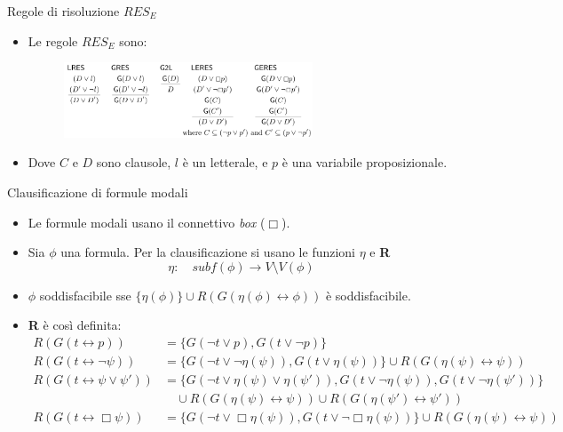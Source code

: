 \documentclass{beamer}
\newcommand{\tto} {\leftrightarrow}
\begin{document}
\begin{frame}{Regole di risoluzione $RES_E$}
    \begin{itemize}
        \item Le regole $RES_E$ sono:
        \begin{figure}
            \centering
            \includegraphics[width=0.7\textwidth, height=0.5\textheight]{assets/res_E.png}
        \end{figure} 
        \item Dove $C$ e $D$ sono clausole, $l$ è un letterale, e $p$ è una variabile proposizionale.
    \end{itemize}
\end{frame}

\begin{frame}{Clausificazione di formule modali}
    \begin{itemize}
        \item Le formule modali usano il connettivo \emph{box} ($\Box$).
        \item Sia $\phi$ una formula. Per la clausificazione si usano le funzioni $\eta$ e \textbf{R}
        \[
            \eta: \quad subf(\phi) \to V \setminus V(\phi)
        \]
        \item $\phi$ soddisfacibile sse $\{ \eta(\phi) \} \cup R(G(\eta(\phi) \tto \phi))$ è soddisfacibile.
        \item \textbf{R} è così definita:
        \[
            \begin{aligned}
            R(G(t \tto p)) &= \{ G(\lnot t \lor p), G(t \lor \lnot p) \} \\
            R(G(t \tto \lnot \psi)) &= \{ G(\lnot t \lor \lnot \eta(\psi)), G(t \lor \eta(\psi)) \} \cup R(G(\eta(\psi) \tto \psi)) \\
            R(G(t \tto \psi \lor \psi')) &= \{ G(\lnot t \lor \eta(\psi) \lor \eta(\psi')), G(t \lor \lnot \eta(\psi)), G(t \lor \lnot \eta(\psi')) \} \\
            & \quad \cup R(G(\eta(\psi) \tto \psi)) \cup R(G(\eta(\psi') \tto \psi')) \\
            R(G(t \tto \Box \psi)) &= \{ G(\lnot t \lor \Box \eta(\psi)), G(t \lor \lnot \Box \eta(\psi)) \} \cup R(G(\eta(\psi) \tto \psi))
            \end{aligned}
        \]
    \end{itemize}

\end{frame}
\end{document}
